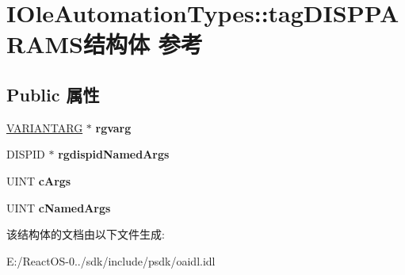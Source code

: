 \hypertarget{struct_i_ole_automation_types_1_1tag_d_i_s_p_p_a_r_a_m_s}{}\section{I\+Ole\+Automation\+Types\+:\+:tag\+D\+I\+S\+P\+P\+A\+R\+A\+M\+S结构体 参考}
\label{struct_i_ole_automation_types_1_1tag_d_i_s_p_p_a_r_a_m_s}
\subsection*{Public 属性}
\begin{DoxyCompactItemize}
\item 
\mbox{\label{struct_i_ole_automation_types_1_1tag_d_i_s_p_p_a_r_a_m_s_a0066baa382209cc6b4de32e1d84d9d08}} 
\hyperlink{structtag_v_a_r_i_a_n_t}{V\+A\+R\+I\+A\+N\+T\+A\+RG} $\ast$ {\bfseries rgvarg}
\item 
\mbox{\label{struct_i_ole_automation_types_1_1tag_d_i_s_p_p_a_r_a_m_s_a483adbe7528caf1c6f39087bef0292cc}} 
D\+I\+S\+P\+ID $\ast$ {\bfseries rgdispid\+Named\+Args}
\item 
\mbox{\label{struct_i_ole_automation_types_1_1tag_d_i_s_p_p_a_r_a_m_s_ac2d218fa63ba1d389c77eb5fff3bd75b}} 
U\+I\+NT {\bfseries c\+Args}
\item 
\mbox{\label{struct_i_ole_automation_types_1_1tag_d_i_s_p_p_a_r_a_m_s_a6dfc3a6bb81cf70d51005171a4e9da58}} 
U\+I\+NT {\bfseries c\+Named\+Args}
\end{DoxyCompactItemize}


该结构体的文档由以下文件生成\+:\begin{DoxyCompactItemize}
\item 
E\+:/\+React\+O\+S-\/0../sdk/include/psdk/oaidl.\+idl\end{DoxyCompactItemize}
